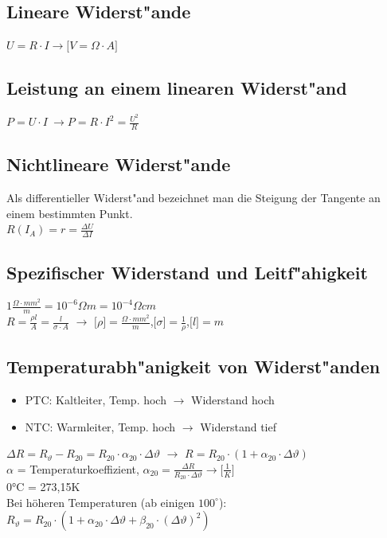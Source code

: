 \begin{multicols}{2}
\subsection{Lineare Widerst"ande}
$U=R \cdot I \rightarrow \lbrack V = \Omega  \cdot  A \rbrack$ \\

\subsection{Leistung an einem linearen Widerst"and}
$P=U \cdot I \ \rightarrow P=R \cdot I^2 = \frac{U^2}{R}$

\subsection{Nichtlineare Widerst"ande}
Als differentieller Widerst"and bezeichnet man die Steigung der Tangente an einem bestimmten Punkt.\\
$R(I_{A}) = r = \frac{\Delta U}{\Delta I}$ \\

\subsection{Spezifischer Widerstand und Leitf"ahigkeit}
$1\frac{\Omega \cdot mm^2}{m} = 10^{-6} \Omega m = 10^{-4} \Omega cm$ \\
$R=\frac{\rho \mathit{l}}{A}=\frac{\mathit{l}}{\sigma \cdot A}$ $\rightarrow$ $\lbrack \rho \rbrack = \frac{ \Omega \cdot mm^2}{m}$,$\lbrack \sigma \rbrack = \frac{1}{\rho}$,$ \lbrack \mathit{l} \rbrack = m$

\subsection{Temperaturabh"anigkeit von Widerst"anden}
\begin{itemize}
	\item PTC: Kaltleiter, Temp. hoch $\rightarrow$ Widerstand hoch
	\item NTC: Warmleiter, Temp. hoch $\rightarrow$ Widerstand tief
\end{itemize}
$\Delta R = R_{\vartheta}-R_{20} = R_{20} \cdot \alpha_{20} \cdot \Delta \vartheta$ $\rightarrow$ $R = R_{20} \cdot (1 + \alpha_{20} \cdot \Delta \vartheta)$\\
$\alpha$ = Temperaturkoeffizient, $\alpha_{20}=\frac{\Delta R}{ R_{20} \cdot \Delta \vartheta} \rightarrow \lbrack \frac{1}{K} \rbrack$\\
0°C = 273,15K \\
Bei höheren Temperaturen (ab einigen $100^\circ$): \\
$R_{\vartheta} = R_{20} \cdot\left( 1 + \alpha_{20} \cdot \Delta \vartheta + \beta_{20} \cdot (\Delta \vartheta)^2 \right)$

\end{multicols}

